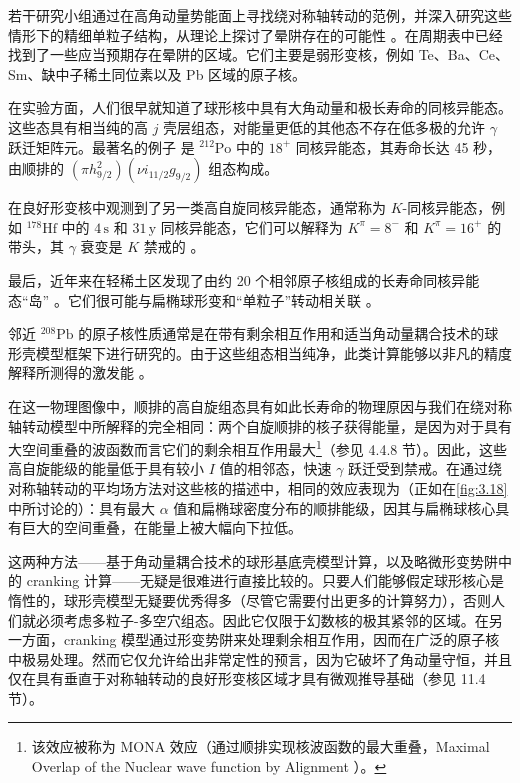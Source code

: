 若干研究小组通过在高角动量势能面上寻找绕对称轴转动的范例，并深入研究这些情形下的精细单粒子结构，从理论上探讨了晕阱存在的可能性 \cite{ALL76,CDS77,AK77,DNM77,PFL78,PTF78,AHL78,Ab78,MDN78}。在周期表中已经找到了一些应当预期存在晕阱的区域。它们主要是弱形变核，例如
Te、Ba、Ce、Sm、缺中子稀土同位素以及 Pb 区域的原子核。

在实验方面，人们很早就知道了球形核中具有大角动量和极长寿命的同核异能态。这些态具有相当纯的高 $j$ 壳层组态，对能量更低的其他态不存在低多极的允许
$\gamma$ 跃迁矩阵元。最著名的例子 \cite{PAG62} 是 $^{212}\text{Po}$ 中的 $18^{+}$
同核异能态，其寿命长达 45 秒，由顺排的 $(\pi h^{2}_{9/2})(\nu i_{11/2}g_{9/2})$ 组态构成。

在良好形变核中观测到了另一类高自旋同核异能态，通常称为 $K$-同核异能态，例如 $^{178}\text{Hf}$ 中的 $4\,\text{s}$
和 $31\,\text{y}$ 同核异能态，它们可以解释为 $K^{\pi}=8^{-}$ 和 $K^{\pi}=16^{+}$
的带头，其 $\gamma$ 衰变是 $K$ 禁戒的 \cite{HR68,KL77}。

最后，近年来在轻稀土区发现了由约 20 个相邻原子核组成的长寿命同核异能态“岛” \cite{PBB77}。它们很可能与扁椭球形变和“单粒子”转动相关联
\cite{AHL78}。

邻近 $^{208}\text{Pb}$ 的原子核性质通常是在带有剩余相互作用和适当角动量耦合技术的球形壳模型框架下进行研究的。由于这些组态相当纯净，此类计算能够以非凡的精度解释所测得的激发能
\cite{BBH77}。

在这一物理图像中，顺排的高自旋组态具有如此长寿命的物理原因与我们在绕对称轴转动模型中所解释的完全相同：两个自旋顺排的核子获得能量，是因为对于具有大空间重叠的波函数而言它们的剩余相互作用最大\footnote{该效应被称为 MONA 效应（通过顺排实现核波函数的最大重叠，Maximal Overlap of the Nuclear wave
function by Alignment \cite{FPD76}）。}（参见 4.4.8 节）。因此，这些高自旋能级的能量低于具有较小 $I$ 值的相邻态，快速 $\gamma$ 跃迁受到禁戒。在通过绕对称轴转动的平均场方法对这些核的描述中，相同的效应表现为（正如在\ref{fig:3.18}
中所讨论的）：具有最大 $\alpha$ 值和扁椭球密度分布的顺排能级，因其与扁椭球核心具有巨大的空间重叠，在能量上被大幅向下拉低。

这两种方法——基于角动量耦合技术的球形基底壳模型计算，以及略微形变势阱中的 cranking 计算——无疑是很难进行直接比较的。只要人们能够假定球形核心是惰性的，球形壳模型无疑要优秀得多（尽管它需要付出更多的计算努力），否则人们就必须考虑多粒子-多空穴组态。因此它仅限于幻数核的极其紧邻的区域。在另一方面，cranking
模型通过形变势阱来处理剩余相互作用，因而在广泛的原子核中极易处理。然而它仅允许给出非常定性的预言，因为它破坏了角动量守恒，并且仅在具有垂直于对称轴转动的良好形变核区域才具有微观推导基础（参见
11.4 节）。
